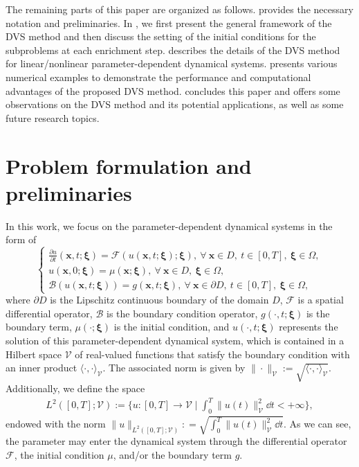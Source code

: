 \documentclass[10pt,a4paper]{article}
\numberwithin{equation}{section}
\numberwithin{lemma}{section}
\numberwithin{example}{section}
\numberwithin{definition}{section}
\numberwithin{assumption}{section}
\numberwithin{theorem}{section}
\numberwithin{proposition}{section}
\numberwithin{corollary}{section}
\numberwithin{remark}{section}
\begin{document}
The remaining parts of this paper are organized as follows.  provides the necessary notation and preliminaries.
In , we first present the general framework of the DVS method and then discuss the setting of the initial conditions for the subproblems at each enrichment step.
 describes the details of the DVS method for linear/nonlinear parameter-dependent dynamical systems. 
 presents 
various numerical examples to demonstrate the performance and computational advantages of the proposed DVS method.
 concludes this paper and offers some observations on the DVS method and its potential applications, as well as some future research topics.





\section{Problem formulation and preliminaries}
\label{ssec:prelim}
In this work, we focus on the parameter-dependent dynamical systems in the form of
\begin{equation}
\label{eq-dynamical-system}
\begin{cases}
\frac{\partial u}{\partial t}(\bm{x},t;\bm{\xi})=\mathcal{F}(u(\bm{x},t;\bm{\xi});\bm{\xi}), \ \forall ~\bm{x} \in D,~ t\in [0,T], ~ \bm{\xi} \in \Omega,\\
u(\bm{x},0;\bm{\xi})= \mu(\bm{x};\bm{\xi}),\ \forall ~\bm{x} \in D, ~ \bm{\xi} \in \Omega,\\
\mathcal{B}(u(\bm{x},t;\bm{\xi}))=g(\bm{x},t;\bm{\xi}), \ \forall ~\bm{x} \in \partial D, ~ t\in [0,T], ~ \bm{\xi} \in \Omega,
\end{cases}
\end{equation} 
where $\partial D$ is the Lipschitz continuous boundary of the domain $D$, 
$\mathcal{F}$ is a spatial differential operator, 
$\mathcal{B}$ is the boundary condition operator, $g(\cdot,t;\bm{\xi})$ is the boundary term, $\mu(\cdot;\bm{\xi})$ is the initial condition, 
and $u(\cdot,t;\bm{\xi})$ represents the solution of this parameter-dependent dynamical system, 
which is contained in a Hilbert space $\mathcal{V}$ of real-valued functions that satisfy the boundary condition with an inner product $\langle \cdot,\cdot\rangle_{\mathcal{V}}$. The associated norm is given by $\|\cdot\|_{\mathcal{V}}:=\sqrt{\langle\cdot,\cdot\rangle_{\mathcal{V}}}$.
Additionally, we define the space 
$$
\begin{array}{ll}
L^2([0,T];\mathcal{V}):=\Big\{u: [0,T]\to \mathcal{V}
\mid  \int_{0}^T\|u(t)\|_{\mathcal{V}}^2 \dd t < +\infty \Big\},
\end{array}
$$
endowed with the norm $\|u\|_{L^2([0,T];\mathcal{V})}:
=\sqrt{\int_{0}^T\|u(t)\|_{\mathcal{V}}^2 \dd t}$.
As we can see, the parameter may enter the dynamical system through the differential operator $\mathcal{F}$, the initial condition $\mu$, and/or the boundary term $g$. 
\end{document}
